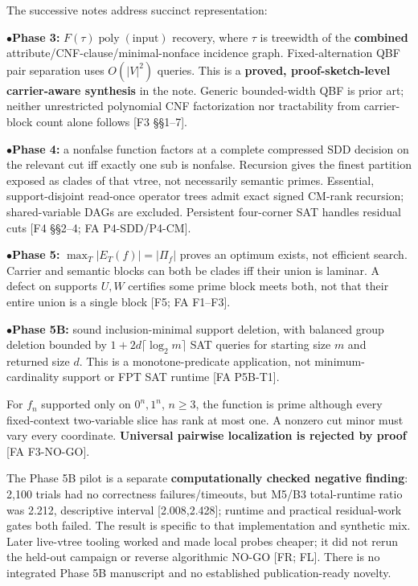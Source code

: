 \documentclass[10pt,letterpaper]{article}
\begin{document}
The successive notes address succinct representation:\par

\noindent$\bullet$\quad \textbf{Phase 3:} \(F(\tau)\operatorname{poly}(\text{input})\) recovery, where \(\tau\) is treewidth of the \textbf{combined} attribute/CNF-clause/minimal-nonface incidence graph. Fixed-alternation QBF pair separation uses \(O(|V|^2)\) queries. This is a \textbf{proved, proof-sketch-level carrier-aware synthesis} in the note. Generic bounded-width QBF is prior art; neither unrestricted polynomial CNF factorization nor tractability from carrier-block count alone follows [F3 \S{}\S{}1--7].\par
\noindent$\bullet$\quad \textbf{Phase 4:} a nonfalse function factors at a complete compressed SDD decision on the relevant cut iff exactly one sub is nonfalse. Recursion gives the finest partition exposed as clades of that vtree, not necessarily semantic primes. Essential, support-disjoint read-once operator trees admit exact signed CM-rank recursion; shared-variable DAGs are excluded. Persistent four-corner SAT handles residual cuts [F4 \S{}\S{}2--4; FA P4-SDD/P4-CM].\par
\noindent$\bullet$\quad \textbf{Phase 5:} \(\max_T|E_T(f)|=|\Pi_f|\) proves an optimum exists, not efficient search. Carrier and semantic blocks can both be clades iff their union is laminar. A defect on supports \(U,W\) certifies some prime block meets both, not that their entire union is a single block [F5; FA F1--F3].\par
\noindent$\bullet$\quad \textbf{Phase 5B:} sound inclusion-minimal support deletion, with balanced group deletion bounded by \(1+2d\lceil\log_2m\rceil\) SAT queries for starting size \(m\) and returned size \(d\). This is a monotone-predicate application, not minimum-cardinality support or FPT SAT runtime [FA P5B-T1].\par

For \(f_n\) supported only on \(0^n,1^n\), \(n\ge3\), the function is prime although every fixed-context two-variable slice has rank at most one. A nonzero cut minor must vary every coordinate. \textbf{Universal pairwise localization is rejected by proof} [FA F3-NO-GO].\par

The Phase 5B pilot is a separate \textbf{computationally checked negative finding}: 2,100 trials had no correctness failures/timeouts, but M5/B3 total-runtime ratio was 2.212, descriptive interval [2.008,2.428]; runtime and practical residual-work gates both failed. The result is specific to that implementation and synthetic mix. Later live-vtree tooling worked and made local probes cheaper; it did not rerun the held-out campaign or reverse algorithmic NO-GO [FR; FL]. There is no integrated Phase 5B manuscript and no established publication-ready novelty.\par
\end{document}
